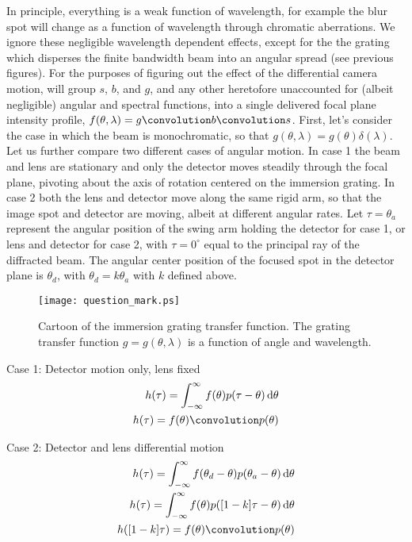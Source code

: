 In principle, everything is a weak function of wavelength, for example the blur spot will change as a function of wavelength through chromatic aberrations.  We ignore these negligible wavelength dependent effects, except for the the grating which disperses the finite bandwidth beam into an angular spread (see previous figures).  For the purposes of figuring out the effect of the differential camera motion, will group $s$, $b$, and $g$, and any other heretofore unaccounted for (albeit negligible) angular and spectral functions, into a single delivered focal plane intensity profile, $f(\theta, \lambda)=g \convolution b \convolution s$.  First, let's consider the case in which the beam is monochromatic, so that $g(\theta, \lambda)=g(\theta)\delta(\lambda)$.  Let us further compare two different cases of angular motion.  In case 1 the beam and lens are stationary and only the detector moves steadily through the focal plane, pivoting about the axis of rotation centered on the immersion grating.  In case 2 both the lens and detector move along the same rigid arm, so that the image spot and detector are moving, albeit at different angular rates.  Let $\tau=\theta_a$ represent the angular position of the swing arm holding the detector for case 1, or lens and detector for case 2, with $\tau=0^\circ$ equal to the principal ray of the diffracted beam.  The angular center position of the focused spot in the detector plane is $\theta_d$, with $\theta_d= k \theta_a$ with $k$ defined above.

\begin{figure}
\begin{center}
    \texttt{[image: question\_mark.ps]}
  \end{center}
  \caption[Immersion grating transfer function]{Cartoon of the immersion grating transfer function.  The grating transfer function $g=g(\theta, \lambda)$ is a function of angle and wavelength.}
\end{figure}

Case 1: Detector motion only, lens fixed
\begin{eqnarray}
	h(\tau) = \int_{-\infty}^{\infty} f(\theta) p(\tau - \theta)\,\mathrm{d}\theta  \nonumber \\
	h(\tau)=f(\theta) \convolution p(\theta)  \nonumber
\end{eqnarray}

Case 2: Detector and lens differential motion
\begin{eqnarray}
	h(\tau) = \int_{-\infty}^{\infty} f(\theta_d - \theta) p(\theta_a - \theta)\,\mathrm{d}\theta  \nonumber \\
	h(\tau) = \int_{-\infty}^{\infty} f(\theta) p([1-k]\tau-\theta)\,\mathrm{d}\theta  \nonumber \\
	h([1-k]\tau)=f(\theta) \convolution p(\theta) \nonumber 
\end{eqnarray}

